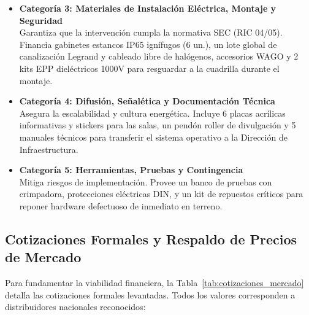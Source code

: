 \begin{itemize}
    \item \textbf{Categoría 3: Materiales de Instalación Eléctrica, Montaje y Seguridad} \\
    Garantiza que la intervención cumpla la normativa SEC (RIC 04/05). Financia gabinetes estancos IP65 ignífugos (6 un.), un lote global de canalización Legrand y cableado libre de halógenos, accesorios WAGO y 2 kits EPP dieléctricos 1000V para resguardar a la cuadrilla durante el montaje.\\
    
    \vspace{-0.3cm}

    \item \textbf{Categoría 4: Difusión, Señalética y Documentación Técnica} \\
    Asegura la escalabilidad y cultura energética. Incluye 6 placas acrílicas informativas y stickers para las salas, un pendón roller de divulgación y 5 manuales técnicos para transferir el sistema operativo a la Dirección de Infraestructura. \\
    
    \vspace{-0.3cm}

    \item \textbf{Categoría 5: Herramientas, Pruebas y Contingencia} \\
    Mitiga riesgos de implementación. Provee un banco de pruebas con crimpadora, protecciones eléctricas DIN, y un kit de repuestos críticos para reponer hardware defectuoso de inmediato en terreno.
\end{itemize}

\newpage

\subsection{Cotizaciones Formales y Respaldo de Precios de Mercado}

Para fundamentar la viabilidad financiera, la Tabla~\ref{tab:cotizaciones_mercado} detalla las cotizaciones formales levantadas. Todos los valores corresponden a distribuidores nacionales reconocidos:

